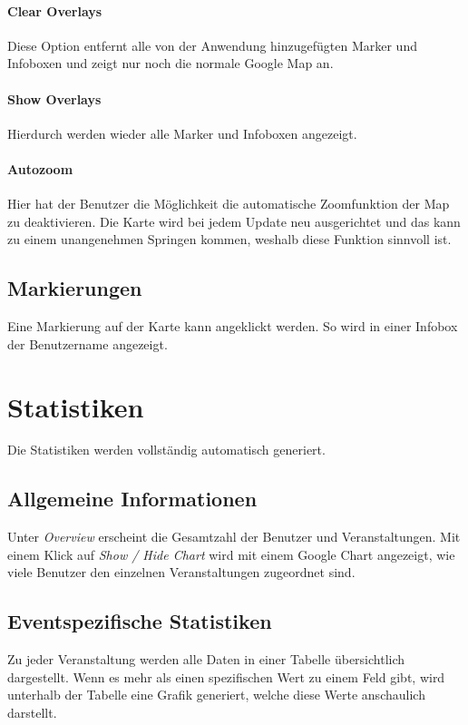 \paragraph{Clear Overlays}
Diese Option entfernt alle von der Anwendung hinzugefügten Marker und Infoboxen und zeigt nur noch die normale Google Map an.

\paragraph{Show Overlays}
Hierdurch werden wieder alle Marker und Infoboxen angezeigt.

\paragraph{Autozoom}
Hier hat der Benutzer die Möglichkeit die automatische Zoomfunktion der Map zu deaktivieren. Die Karte wird bei jedem Update neu ausgerichtet und das kann zu einem unangenehmen \glqq Springen \grqq{} kommen, weshalb diese Funktion sinnvoll ist.

\subsection{Markierungen}
Eine Markierung auf der Karte kann angeklickt werden. So wird in einer Infobox der Benutzername angezeigt.


\section{Statistiken}
Die Statistiken werden vollständig automatisch generiert.

\subsection{Allgemeine Informationen}
Unter \emph{Overview} erscheint die Gesamtzahl der Benutzer und Veranstaltungen. Mit einem Klick auf \emph{Show / Hide Chart} wird mit einem Google Chart angezeigt, wie viele Benutzer den einzelnen Veranstaltungen zugeordnet sind.

\subsection{Eventspezifische Statistiken}
Zu jeder Veranstaltung werden alle Daten in einer Tabelle übersichtlich dargestellt. Wenn es mehr als einen spezifischen Wert zu einem Feld gibt, wird unterhalb der Tabelle eine Grafik generiert, welche diese Werte anschaulich darstellt.

